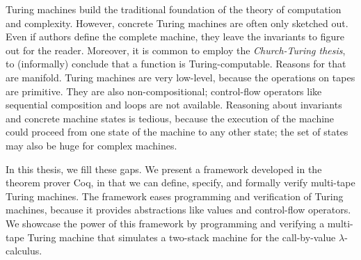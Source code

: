 Turing machines build the traditional foundation of the theory of computation and complexity.  However, concrete Turing machines are often only
sketched out.  Even if authors define the complete machine, they leave the invariants to figure out for the reader.  Moreover, it is common to employ
the \textit{Church-Turing thesis}, to (informally) conclude that a function is Turing-computable.  Reasons for that are manifold.  Turing machines are
very low-level, because the operations on tapes are primitive.  They are also non-compositional; control-flow operators like sequential composition
and loops are not available.  Reasoning about invariants and concrete machine states is tedious, because the execution of the machine could proceed
from one state of the machine to any other state; the set of states may also be huge for complex machines.

In this thesis, we fill these gaps.  We present a framework developed in the theorem prover Coq, in that we can define, specify, and formally verify
multi-tape Turing machines.  The framework eases programming and verification of Turing machines, because it provides abstractions like values and
control-flow operators.  We showcase the power of this framework by programming and verifying a multi-tape Turing machine that simulates a two-stack
machine for the call-by-value $\lambda$-calculus.


